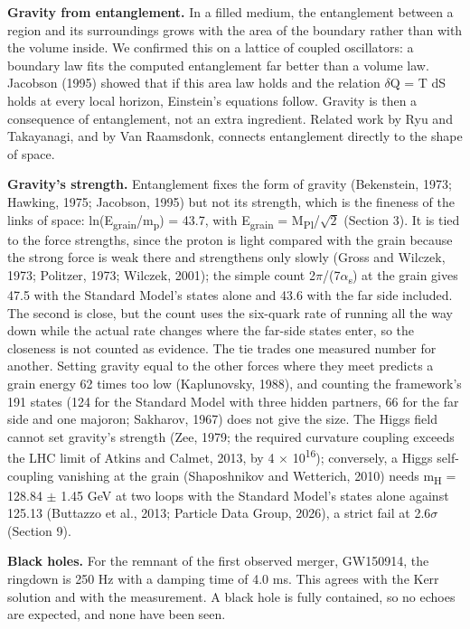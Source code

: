 \documentclass[
  11pt,
]{article}
\newcounter{none} %
\begin{document}
\textbf{Gravity from entanglement.} In a filled medium, the entanglement between a region and its surroundings grows with the area of the boundary rather than with the volume inside. We confirmed this on a lattice of coupled oscillators: a boundary law fits the computed entanglement far better than a volume law. Jacobson (1995) showed that if this area law holds and the relation \ensuremath{\delta}Q = T dS holds at every local horizon, Einstein's equations follow. Gravity is then a consequence of entanglement, not an extra ingredient. Related work by Ryu and Takayanagi, and by Van Raamsdonk, connects entanglement directly to the shape of space.

\textbf{Gravity's strength.} Entanglement fixes the form of gravity (Bekenstein, 1973; Hawking, 1975; Jacobson, 1995) but not its strength, which is the fineness of the links of space: ln(E\textsubscript{grain}/m\textsubscript{p}) = 43.7, with E\textsubscript{grain} = M\textsubscript{Pl}/\ensuremath{\sqrt{2}} (Section 3). It is tied to the force strengths, since the proton is light compared with the grain because the strong force is weak there and strengthens only slowly (Gross and Wilczek, 1973; Politzer, 1973; Wilczek, 2001); the simple count 2\ensuremath{\pi}/(7\ensuremath{\alpha}\textsubscript{s}) at the grain gives 47.5 with the Standard Model's states alone and 43.6 with the far side included. The second is close, but the count uses the six-quark rate of running all the way down while the actual rate changes where the far-side states enter, so the closeness is not counted as evidence. The tie trades one measured number for another. Setting gravity equal to the other forces where they meet predicts a grain energy 62 times too low (Kaplunovsky, 1988), and counting the framework's 191 states (124 for the Standard Model with three hidden partners, 66 for the far side and one majoron; Sakharov, 1967) does not give the size. The Higgs field cannot set gravity's strength (Zee, 1979; the required curvature coupling exceeds the LHC limit of Atkins and Calmet, 2013, by 4 \ensuremath{\times} 10\textsuperscript{16}); conversely, a Higgs self-coupling vanishing at the grain (Shaposhnikov and Wetterich, 2010) needs m\textsubscript{H} = 128.84 \ensuremath{\pm} 1.45 GeV at two loops with the Standard Model's states alone against 125.13 (Buttazzo et al., 2013; Particle Data Group, 2026), a strict fail at 2.6\ensuremath{\sigma} (Section 9).

\textbf{Black holes.} For the remnant of the first observed merger, GW150914, the ringdown is 250 Hz with a damping time of 4.0 ms. This agrees with the Kerr solution and with the measurement. A black hole is fully contained, so no echoes are expected, and none have been seen.
\end{document}

